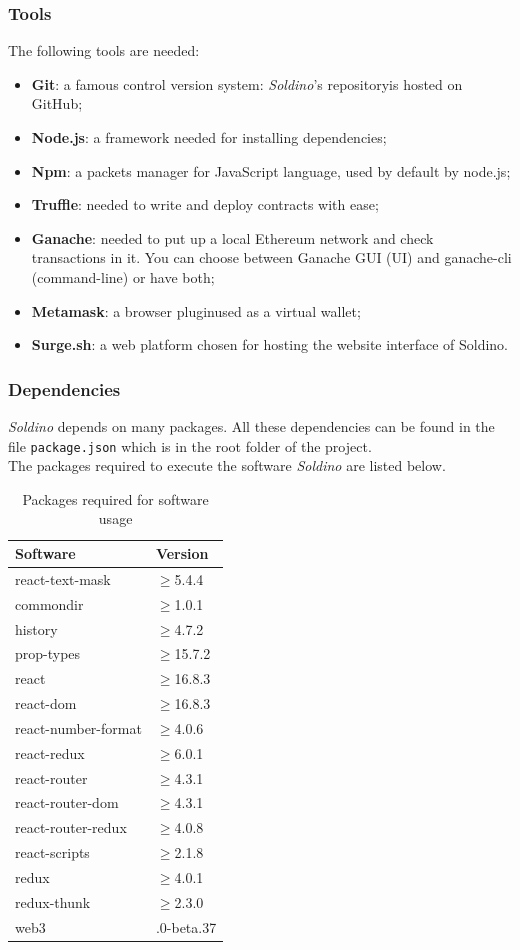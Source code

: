 \subsubsection{Tools}
The following tools are needed:
\begin{itemize}
	\item \textbf{Git}: a famous control version system: \textit{Soldino}'s 
	repository\glosp is hosted on GitHub\glo;
	\item \textbf{Node.js\glo}: a framework needed for installing dependencies;
	\item \textbf{Npm\glo}: a packets manager for JavaScript language, used by default by node.js;
	\item \textbf{Truffle\glo}: needed to write and deploy contracts with ease;
	\item \textbf{Ganache\glo}: needed to put up a local Ethereum network and check 
	transactions in it. You can choose between Ganache GUI (UI) and ganache-cli (command-line) or have both;
	\item \textbf{Metamask\glo}: a browser plugin\glosp used as a virtual wallet;
	\item \textbf{Surge.sh\glo}: a web platform chosen for hosting the website 
	interface of Soldino.
\end{itemize}

\subsubsection{Dependencies}
\textit{Soldino} depends on many packages. All these dependencies can be found 
in the file \texttt{package.json} which is in the root folder of the project.\\
The packages required to execute the software \textit{Soldino} are listed below.\\

\renewcommand{\arraystretch}{1.5}
\begin{longtable}{ 
		>{\centering}p{} 
		>{\centering}p{}
	}
	\caption{Packages required for software usage}\\
	\rowcolorhead
	\textbf{\color{white}Software} & 
	\textbf{\color{white}Version}
	\tabularnewline  
	\endhead    
	
	
	
	react-text-mask & $\geq$5.4.4
	\tabularnewline
	commondir &$\geq$1.0.1
	\tabularnewline
	history &$\geq$4.7.2
	\tabularnewline
	prop-types &$\geq$15.7.2\tabularnewline
	react &$\geq$16.8.3\tabularnewline
	react-dom &$\geq$16.8.3\tabularnewline
	react-number-format &$\geq$4.0.6\tabularnewline
	react-redux &$\geq$6.0.1\tabularnewline
	react-router &$\geq$4.3.1\tabularnewline
	react-router-dom &$\geq$4.3.1\tabularnewline
	react-router-redux &$\geq$4.0.8\tabularnewline
	react-scripts &$\geq$2.1.8\tabularnewline
	redux &$\geq$4.0.1\tabularnewline
	redux-thunk &$\geq$2.3.0\tabularnewline
	web3 & 1.0.0-beta.37\tabularnewline
	
\end{longtable}

